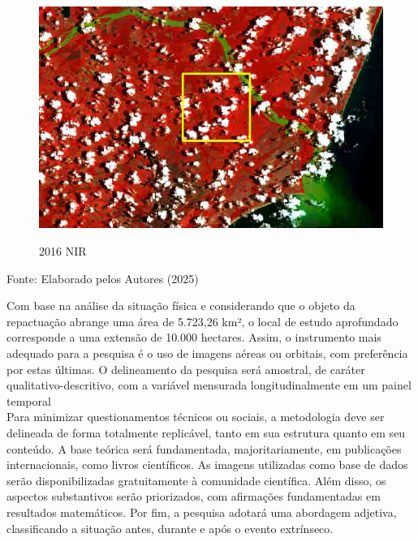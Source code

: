 				\begin{minipage}[t!]{0.33\textwidth}
					\begin{figure}[H]
						\centering \small \caption{2016 NIR}
						\includegraphics[width=0.97\linewidth]{FIGURAS/lama1red}
						\label{fig:indao3} 
					\end{figure}					
				\end{minipage} 
				\begin{center}
					Fonte:   Elaborado pelos Autores (2025)
				\end{center}
	
	\hspace*{1.25 cm} Com base na análise da situação física e considerando que o objeto da repactuação abrange uma área de 5.723,26 km², o local de estudo aprofundado corresponde a uma extensão de 10.000 hectares. Assim, o instrumento mais adequado para a pesquisa é o uso de imagens aéreas ou orbitais, com preferência por estas últimas. O delineamento da pesquisa será amostral, de caráter qualitativo-descritivo, com a variável mensurada longitudinalmente em um painel temporal\\
	\hspace*{1.25 cm} Para minimizar questionamentos técnicos ou sociais, a metodologia deve ser delineada de forma totalmente replicável, tanto em sua estrutura quanto em seu conteúdo. A base teórica será fundamentada, majoritariamente, em publicações internacionais, como livros científicos. As imagens utilizadas como base de dados serão disponibilizadas gratuitamente à comunidade científica. Além disso, os aspectos substantivos serão priorizados, com afirmações fundamentadas em resultados matemáticos. Por fim, a pesquisa adotará uma abordagem adjetiva, classificando a situação antes, durante e após o evento extrínseco.

